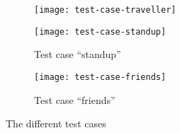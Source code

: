 \begin{figure}
    \begin{subfigure}{\textwidth}
        \centering
        \texttt{[image: test-case-traveller]}
        \label{fig:test-case-traveller}
    \end{subfigure}

    \begin{subfigure}{\textwidth}
        \centering
        \texttt{[image: test-case-standup]}
        \caption{Test case ``standup''}\label{fig:test-case-standup}
    \end{subfigure}

    \begin{subfigure}{\textwidth}
        \centering
        \texttt{[image: test-case-friends]}
        \caption{Test case ``friends''}\label{fig:test-case-friends}
    \end{subfigure}
    \caption{The different test cases}
    \label{fig:test-cases}
\end{figure}
